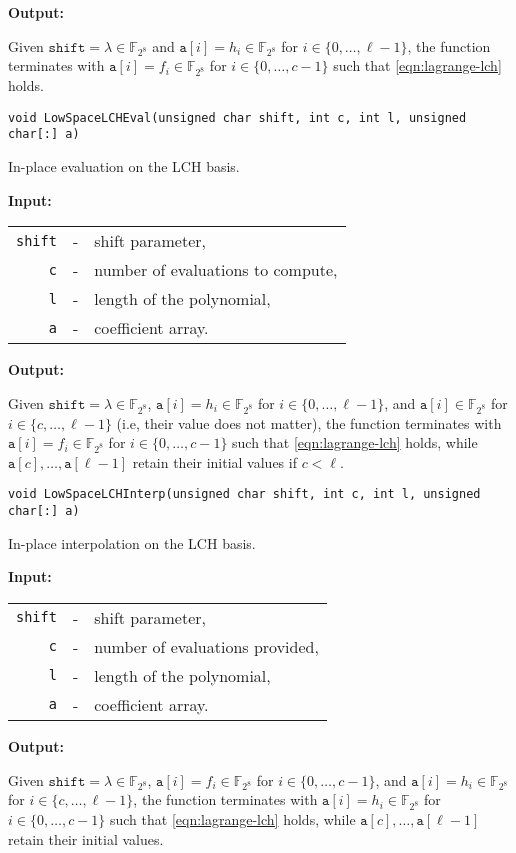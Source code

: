 \documentclass{amsart}
\makeatletter
\newcommand{\F}{\mathbb{F}}
\newcommand{\Input}{\textbf{Input:}}
\newcommand{\Output}{\textbf{Output:}}
\newcommand{\lsXtoL}{LowSpaceLCHEval}
\newcommand{\lsLtoX}{LowSpaceLCHInterp}
\newenvironment{inputs}{\Input\par\begin{tabular}{@{}rcl}}{\end{tabular}}
\newenvironment{outputs}{\Output\par}{}
\makeatother
\begin{document}
\begin{outputs}
	Given $\texttt{shift}=\lambda\in\F_{2^8}$ and $\texttt{a}[i]=h_i\in\F_{2^8}$ for
	$i\in\{0,\dotsc,\ell-1\}$, the function terminates with
	$\texttt{a}[i]=f_i\in\F_{2^8}$ for $i\in\{0,\dotsc,c-1\}$ such that
	\eqref{eqn:lagrange-lch} holds.
\end{outputs}

\texttt{void \lsXtoL(unsigned char shift, int c, int l, unsigned char[:]~a)}

In-place evaluation on the LCH basis.

\begin{inputs}
	\texttt{shift} & - & shift parameter,                  \\
	\texttt{c}     & - & number of evaluations to compute, \\
	\texttt{l}     & - & length of the polynomial,         \\
	\texttt{a}     & - & coefficient array.
\end{inputs}

\begin{outputs}
	Given $\texttt{shift}=\lambda\in\F_{2^8}$, $\texttt{a}[i]=h_i\in\F_{2^8}$ for
	$i\in\{0,\dotsc,\ell-1\}$, and $\texttt{a}[i]\in\F_{2^8}$ for
	$i\in\{c,\dotsc,\ell-1\}$ (i.e, their value does not matter), the function terminates with
	$\texttt{a}[i]=f_i\in\F_{2^8}$ for $i\in\{0,\dotsc,c-1\}$ such that
	\eqref{eqn:lagrange-lch} holds, while $\texttt{a}[c],\dotsc,\texttt{a}[\ell-1]$
	retain their initial values if $c<\ell$.
\end{outputs}

\texttt{void \lsLtoX(unsigned char shift, int c, int l, unsigned char[:]~a)}

In-place interpolation on the LCH basis.

\begin{inputs}
	\texttt{shift} & - & shift parameter,                \\
	\texttt{c}     & - & number of evaluations provided, \\
	\texttt{l}     & - & length of the polynomial,       \\
	\texttt{a}     & - & coefficient array.
\end{inputs}

\begin{outputs}
	Given $\texttt{shift}=\lambda\in\F_{2^8}$, $\texttt{a}[i]=f_i\in\F_{2^8}$ for
	$i\in\{0,\dotsc,c-1\}$, and $\texttt{a}[i]=h_i\in\F_{2^8}$ for
	$i\in\{c,\dotsc,\ell-1\}$, the function terminates with
	$\texttt{a}[i]=h_i\in\F_{2^8}$ for $i\in\{0,\dotsc,c-1\}$ such that
	\eqref{eqn:lagrange-lch} holds, while $\texttt{a}[c],\dotsc,\texttt{a}[\ell-1]$ 
	retain their initial values.
\end{outputs} 
\end{document}
